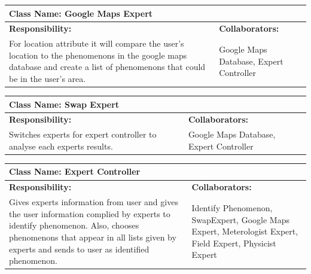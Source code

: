 \documentclass[]{article}
\begin{document}
	\begin{table}[ht]
		\centering
		\begin{tabular}{|p{5cm}|p{5cm}|}
		\hline 
		 \multicolumn{2}{|l|}{\textbf{Class Name: Google Maps Expert}} \\
		\hline
		\textbf{Responsibility:} & \textbf{Collaborators:} \\
		\hline
		For location attribute it will compare the user's location to the phenomenons in the google maps database and create a list of phenomenons that could be in the user's area.\vspace{1in} & Google Maps Database, Expert Controller\\
		\hline
		\end{tabular}
	\end{table}

	\begin{table}[ht]
		\centering
		\begin{tabular}{|p{5cm}|p{5cm}|}
		\hline 
		 \multicolumn{2}{|l|}{\textbf{Class Name: Swap Expert}} \\
		\hline
		\textbf{Responsibility:} & \textbf{Collaborators:} \\
		\hline
		Switches experts for expert controller to analyse each experts results. \vspace{1in} & Google Maps Database, Expert Controller\\
		\hline
		\end{tabular}
	\end{table}

	\begin{table}[ht]
		\centering
		\begin{tabular}{|p{5cm}|p{5cm}|}
		\hline 
		 \multicolumn{2}{|l|}{\textbf{Class Name: Expert Controller}} \\
		\hline
		\textbf{Responsibility:} & \textbf{Collaborators:} \\
		\hline
		Gives experts information from user and gives the user information complied by experts to identify phenomenon. Also, chooses phenomenons that appear in all lists given by experts and sends to user as identified phenomenon. \vspace{1in} & Identify Phenomenon, SwapExpert, Google Maps Expert, Meterologist Expert, Field Expert, Physicist Expert\\
		\hline
		\end{tabular}
	\end{table}
	
\end{document}
